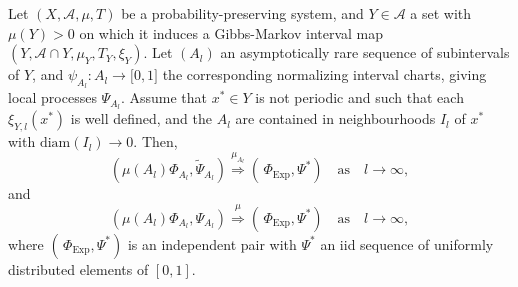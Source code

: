 \documentclass[AHL,Unicode,longabstracts]{cedram}
\newcommand{\clA}{\mathcal{A}}
\newcommand{\Expl}{\mathrm{Exp}}
\newcommand{\diam}{\mathrm{diam}}
\begin{document}
\begin{theo}\label{T_SpatioTempIntervalMapsInducing}
Let $(X,\clA,\mu,T)$ be a probability-preserving system, and $Y\in\clA$ a set with $\mu(Y)>0$ on which it induces a Gibbs-Markov interval map $(Y,\clA\cap Y,\mu _{Y},T_{Y},\xi_{Y})$. Let $(A_{l})$ an asymptotically rare sequence of subintervals of $Y$, and $\psi_{A_{l}}:A_{l}\rightarrow\lbrack0,1]$ the corresponding normalizing interval charts, giving local processes $\Psi _{A_{l}}$. Assume that $x^{\ast}\in Y$ is not periodic and such that each $\xi_{Y,l}(x^{\ast})$ is well defined, and the $A_{l}$ are contained in neighbourhoods $I_{l}$ of $x^{\ast}$ with $\diam(I_{l})\rightarrow0 $. Then,
\begin{equation}\label{Eq_slslslslsslsl}
\left(\mu(A_{l})\Phi_{A_{l}},\widetilde{\Psi}_{A_{l}}\right)\overset{\mu_{A_{l}}}{\Longrightarrow}\left(\,\Phi_{\Expl},\Psi^{\ast}\right)\quad\text{as}\quad l\rightarrow\infty, 
\end{equation}
and
\begin{equation}\label{Eq_jhbvfjhfedbvhdfabvjhadvahg}
\left(\mu(A_{l})\Phi_{A_{l}},\Psi_{A_{l}}\right)\overset{\mu}{\Longrightarrow} \left(\,\Phi_{\Expl},\Psi^{\ast}\right)\quad\text{as}\quad l\rightarrow\infty,
\end{equation}
where $(\,\Phi_{\Expl},\Psi^{\ast})$ is an independent pair with $\Psi^{\ast}$ an iid sequence of uniformly distributed elements of $[0,1]$.
\end{theo}
\end{document}
